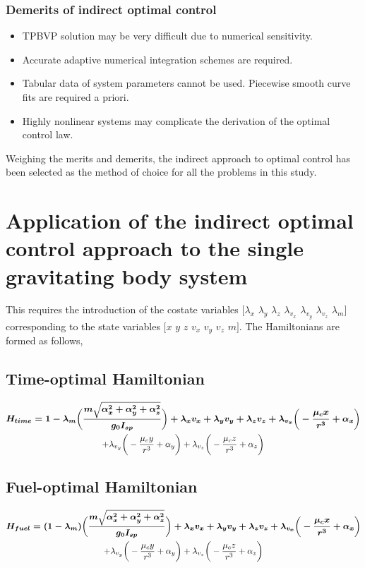 \subsubsection{Demerits of indirect optimal control}
\begin{itemize}
	\item TPBVP solution may be very difficult due to numerical sensitivity.
	\item Accurate adaptive numerical integration schemes are required.
	\item Tabular data of system parameters cannot be used. Piecewise smooth curve fits are required a priori.
	\item Highly nonlinear systems may complicate the derivation of the optimal control law.
\end{itemize}

Weighing the merits and demerits, the indirect approach to optimal control has been selected as the method of choice for all the problems in this study.

\section{Application of the indirect optimal control approach to the single gravitating body system}
This requires the introduction of the costate variables $[$$\lambda_x$ $\lambda_y$ $\lambda_z$ $\lambda_{v_x}$ $\lambda_{v_y}$ $\lambda_{v_z}$ $\lambda_m$$]$ corresponding to the state variables $[$$x$ $y$ $z$ $v_x$ $v_y$ $v_z$ $m$$]$. The Hamiltonians are formed as follows,
\subsection{Time-optimal Hamiltonian}
\begin{multline}
	\boldmath{H_{time}}=1-\lambda_m\bigg(\frac{m\sqrt{\alpha_x^2+\alpha_y^2+\alpha_z^2}}{g_0 I_{sp}}\bigg)+\lambda_x v_x + \lambda_y v_y + \lambda_z v_z +\lambda_{v_x}\bigg(-\frac{\mu_c x}{r^3}+\alpha_x\bigg)\\
	+\lambda_{v_y}\bigg(-\frac{\mu_c y}{r^3}+\alpha_y\bigg)+\lambda_{v_z}\bigg(-\frac{\mu_c z}{r^3}+\alpha_z\bigg)
\end{multline}
\subsection{Fuel-optimal Hamiltonian}
\begin{multline}
	\boldmath{H_{fuel}}=(1-\lambda_m)\bigg(\frac{m\sqrt{\alpha_x^2+\alpha_y^2+\alpha_z^2}}{g_0 I_{sp}}\bigg)+\lambda_x v_x + \lambda_y v_y + \lambda_z v_z +\lambda_{v_x}\bigg(-\frac{\mu_c x}{r^3}+\alpha_x\bigg)\\
	+\lambda_{v_y}\bigg(-\frac{\mu_c y}{r^3}+\alpha_y\bigg)+\lambda_{v_z}\bigg(-\frac{\mu_c z}{r^3}+\alpha_z\bigg)
\end{multline}

